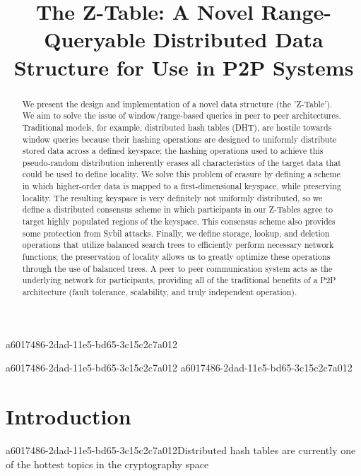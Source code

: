 \documentclass[12pt]{article}
\title{The Z-Table: A Novel Range-Queryable Distributed Data Structure for Use in P2P Systems}
\begin{document}
\maketitle
a6017486-2dad-11e5-bd65-3c15c2c7a012
\begin{abstract}
We present the design and implementation of a novel data structure (the 'Z-Table'). We aim to solve the issue of window/range-based queries in peer to peer architectures. Traditional models, for example,  distributed hash tables (DHT), are hostile towards window queries because their hashing operations are designed to uniformly distribute stored data across a defined keyspace; the hashing operations used to achieve this pseudo-random distribution inherently erases all characteristics of the target data that could be used to define locality. We solve this problem of erasure by defining a scheme in which higher-order data is mapped to a first-dimensional keyspace, while preserving locality. The resulting keyspace is very definitely not uniformly distributed, so we define a distributed consensus scheme in which participants in our Z-Tables agree to target highly populated regions of the keyspace. This consensus scheme also provides some protection from Sybil attacks. Finally, we define storage, lookup, and deletion operations that utilize balanced search trees to efficiently perform necessary network functions; the preservation of locality allows us to greatly optimize these operations through the use of balanced trees. A peer to peer communication system acts as the underlying network for participants, providing all of the traditional benefits of a P2P architecture (fault tolerance, scalability, and truly independent operation).
\end{abstract}


a6017486-2dad-11e5-bd65-3c15c2c7a012\newpage
a6017486-2dad-11e5-bd65-3c15c2c7a012\section{Introduction}
a6017486-2dad-11e5-bd65-3c15c2c7a012Distributed hash tables are currently one of the hottest topics in the cryptography space~\cite{Stoica:2001dj,Rowstron:2001ea,Ratnasamy:2001wn}

\printbibliography
\end{document}
